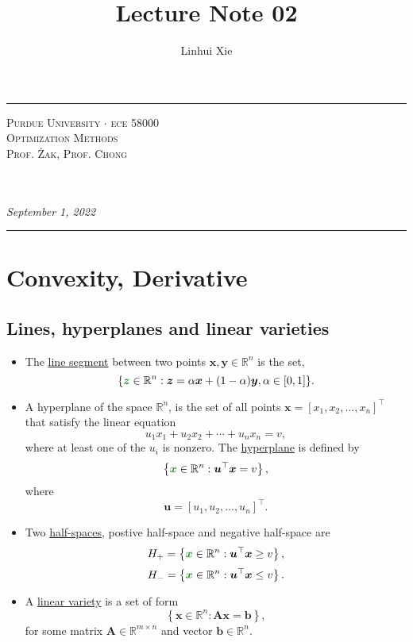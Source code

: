 \documentclass[12pt,thmsa]{article}
\author{Linhui Xie}
\title{Lecture Note 02}
\makeatletter
\def\maketitle{%
	\par
	\hrule height 1.5pt\vspace{1ex}
	\par\noindent
	
	\begin{minipage}{0.5\textwidth}
		\scshape
		Purdue University \(\cdot\) ece 58000 \\[1ex]
		Optimization Methods \\
		Prof. Żak, Prof. Chong
	\end{minipage}
	\begin{minipage}{0.45\textwidth}
		\raggedleft
		\MakeTextUppercase{{\@title}}\\[0.3ex] %
		\textit{\@author}\\[0.2ex]
		\textit{September 1, 2022}
	\end{minipage}
	\par\vspace{1ex}
	\hrule height 1.5pt\vspace{1ex}
	\par
}
\makeatother
\begin{document}
\maketitle

\setcounter{section}{1}
\section{Convexity, Derivative\medskip}

\setcounter{section}{2}

\subsection{Lines, hyperplanes and linear varieties}

\begin{itemize}
	\item The \underline{line segment} between two points \(\boldsymbol{x}, \boldsymbol{y} \in \mathbb{R}^{n}\) is the set,
	\[
	\{{\color{forestgreen}{\boldsymbol{z}}} \in \mathbb{R}^{n}: \boldsymbol{z} = \alpha \boldsymbol{x}+(1-\alpha) \boldsymbol{y}, \alpha \in[0,1]\}.
	\]
	
	\item A hyperplane of the space \(\mathbb{R}^{n} \), is the set of all points \(\boldsymbol{x}=\left[x_{1}, x_{2}, \ldots, x_{n}\right]^{\top}\) that satisfy the linear equation
	\[
	u_{1} x_{1}+u_{2} x_{2}+\cdots+u_{n} x_{n}=v,
	\]
	where at least one of the \(u_{i}\) is nonzero. The \underline{hyperplane}  is defined by
	\[
	\left\{{\color{forestgreen}{\boldsymbol{x}}} \in \mathbb{R}^{n}: \boldsymbol{u}^{\top} \boldsymbol{x}=v\right\},
	\]where
	\[
	\boldsymbol{u}=\left[u_{1}, u_{2}, \ldots, u_{n}\right]^{\top}.
	\]
	
	\item Two \underline{half-spaces}, postive half-space and negative half-space are
	\[ H_{+}=\left\{{\color{forestgreen}{\boldsymbol{x}}} \in \mathbb{R}^{n}: \boldsymbol{u}^{\top} \boldsymbol{x} \geq v\right\}, \]
	\[ H_{-}=\left\{{\color{forestgreen}{\boldsymbol{x}}} \in \mathbb{R}^{n}: \boldsymbol{u}^{\top} \boldsymbol{x} \leq v\right\}. \]
	
	\item  A \underline{linear variety} is a set of form
	\[ \left\{\boldsymbol{x} \in \mathbb{R}^{n} : \mathbf{A}\boldsymbol{x} = \boldsymbol{b} \right\},  \]
	for some matrix \(\mathbf{A} \in \mathbb{R}^{m \times n}\) and vector \(\boldsymbol{b} \in \mathbb{R}^{n}\).
\end{itemize}
\end{document}
